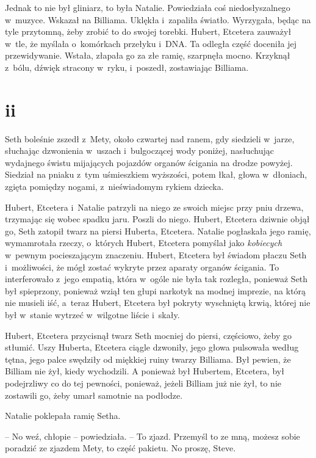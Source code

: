\documentclass[oneside,polish,11pt,sfheadings]{mwbk}
\begin{document}
Jednak to nie był gliniarz, to była Natalie. Powiedziała coś
niedosłyszalnego w~muzyce. Wskazał na Billiama. Uklękła i~zapaliła
światło. Wyrzygała, będąc na tyle przytomną, żeby zrobić to do swojej
torebki. Hubert, Etcetera zauważył w~tle, że myślała o~komórkach
przełyku i~DNA. Ta odległa część doceniła jej przewidywanie. Wstała,
złapała go za złe ramię, szarpnęła mocno. Krzyknął z~bólu, dźwięk
stracony w~ryku, i~poszedł, zostawiając Billiama.

\chapter*{ii}

Seth boleśnie zszedł z~Mety, około czwartej nad ranem, gdy siedzieli w~jarze, słuchając dzwonienia w~uszach i~bulgoczącej wody poniżej,
nasłuchując wydajnego świstu mijających pojazdów organów ścigania na
drodze powyżej. Siedział na pniaku z~tym uśmieszkiem wyższości, potem
łkał, głowa w~dłoniach, zgięta pomiędzy nogami, z~nieświadomym rykiem
dziecka.

Hubert, Etcetera i~Natalie patrzyli na niego ze swoich miejsc przy pniu
drzewa, trzymając się wobec spadku jaru. Poszli do niego. Hubert,
Etcetera dziwnie objął go, Seth zatopił twarz na piersi Huberta,
Etcetera. Natalie pogłaskała jego ramię, wymamrotała rzeczy, o~których
Hubert, Etcetera pomyślał jako \textit{kobiecych} w~pewnym pocieszającym
znaczeniu. Hubert, Etcetera był świadom płaczu Seth i~możliwości, że
mógł zostać wykryte przez aparaty organów ścigania. To interferowało z~jego empatią, która w~ogóle nie była tak rozległa, ponieważ Seth był
spieprzony, ponieważ wziął ten głupi narkotyk na modnej imprezie, na
którą nie musieli iść, a~teraz Hubert, Etcetera był pokryty wyschniętą
krwią, której nie był w~stanie wytrzeć w~wilgotne liście i~skały.

Hubert, Etcetera przycisnął twarz Seth mocniej do piersi, częściowo,
żeby go stłumić. Uszy Huberta, Etcetera ciągle dzwoniły, jego głowa
pulsowała według tętna, jego palce swędziły od miękkiej ruiny twarzy
Billiama. Był pewien, że Billiam nie żył, kiedy wychodzili. A ponieważ
był Hubertem, Etcetera, był podejrzliwy co do tej pewności, ponieważ,
jeżeli Billiam już nie żył, to nie zostawili go, żeby umarł samotnie na
podłodze.

Natalie poklepała ramię Setha.

-- No weź, chłopie -- powiedziała. -- To zjazd. Przemyśl to ze mną, możesz
sobie poradzić ze zjazdem Mety, to część pakietu. No proszę, Steve.
\end{document}
